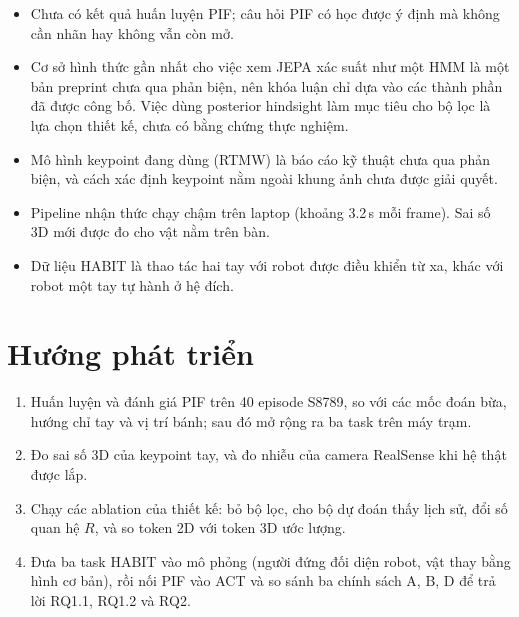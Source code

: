 \begin{itemize}
  \item Chưa có kết quả huấn luyện PIF; câu hỏi PIF có học được ý định mà không cần nhãn hay không vẫn còn mở.
  \item Cơ sở hình thức gần nhất cho việc xem JEPA xác suất như một HMM là một bản preprint chưa qua phản biện, nên khóa luận chỉ dựa vào các thành phần đã được công bố. Việc dùng posterior hindsight làm mục tiêu cho bộ lọc là lựa chọn thiết kế, chưa có bằng chứng thực nghiệm.
  \item Mô hình keypoint đang dùng (RTMW) là báo cáo kỹ thuật chưa qua phản biện, và cách xác định keypoint nằm ngoài khung ảnh chưa được giải quyết.
  \item Pipeline nhận thức chạy chậm trên laptop (khoảng 3.2\,s mỗi frame). Sai số 3D mới được đo cho vật nằm trên bàn.
  \item Dữ liệu HABIT là thao tác hai tay với robot được điều khiển từ xa, khác với robot một tay tự hành ở hệ đích.
\end{itemize}

\section{Hướng phát triển}

\begin{enumerate}
  \item Huấn luyện và đánh giá PIF trên 40 episode S8789, so với các mốc đoán bừa, hướng chỉ tay và vị trí bánh; sau đó mở rộng ra ba task trên máy trạm.
  \item Đo sai số 3D của keypoint tay, và đo nhiễu của camera RealSense khi hệ thật được lắp.
  \item Chạy các ablation của thiết kế: bỏ bộ lọc, cho bộ dự đoán thấy lịch sử, đổi số quan hệ $R$, và so token 2D với token 3D ước lượng.
  \item Đưa ba task HABIT vào mô phỏng (người đứng đối diện robot, vật thay bằng hình cơ bản), rồi nối PIF vào ACT và so sánh ba chính sách A, B, D để trả lời RQ1.1, RQ1.2 và RQ2.
\end{enumerate}
